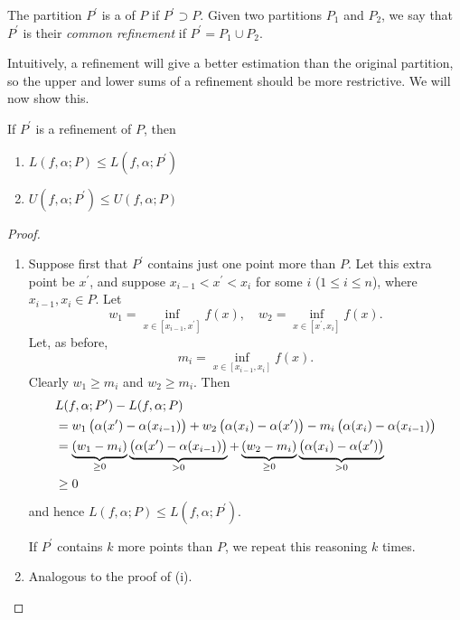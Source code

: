 The partition $P^\prime$ is a  of $P$ if $P^\prime\supset P$. Given two partitions $P_1$ and $P_2$, we say that $P^\prime$ is their \emph{common refinement} if $P^\prime=P_1\cup P_2$.

Intuitively, a refinement will give a better estimation than the original partition, so the upper and lower sums of a refinement should be more restrictive. We will now show this.

\begin{lemma}\label{lemma:int-refinement}
If $P^\prime$ is a refinement of $P$, then
\begin{enumerate}[label=(\roman*)]
\item $L(f,\alpha;P)\le L(f,\alpha;P^\prime)$
\item $U(f,\alpha;P^\prime)\le U(f,\alpha;P)$
\end{enumerate}
\end{lemma}

\begin{proof} \
\begin{enumerate}[label=(\roman*)]
\item Suppose first that $P^\prime$ contains just one point more than $P$. Let this extra point be $x^\prime$, and suppose $x_{i-1}<x^\prime<x_i$ for some $i$ ($1\le i\le n$), where $x_{i-1},x_i\in P$. Let
\[w_1=\inf_{x\in[x_{i-1},x^\prime]}f(x),\quad w_2=\inf_{x\in[x^\prime,x_i]}f(x).\]
Let, as before,
\[m_i=\inf_{x\in[x_{i-1},x_i]}f(x).\]
Clearly $w_1\ge m_i$ and $w_2\ge m_i$. Then
\begin{align*}
&L(f,\alpha;P^\prime)-L(f,\alpha;P)\\
&=w_1\left(\alpha(x^\prime)-\alpha(x_{i-1})\right)+w_2\left(\alpha(x_i)-\alpha(x^\prime)\right)-m_i\left(\alpha(x_i)-\alpha(x_{i-1})\right)\\
&=\underbrace{(w_1-m_i)}_{\ge0}\underbrace{\left(\alpha(x^\prime)-\alpha(x_{i-1})\right)}_{>0}+\underbrace{(w_2-m_i)}_{\ge0}\underbrace{\left(\alpha(x_i)-\alpha(x^\prime)\right)}_{>0}\\
&\ge0
\end{align*}
and hence $L(f,\alpha;P)\le L(f,\alpha;P^\prime)$.

If $P^\prime$ contains $k$ more points than $P$, we repeat this reasoning $k$ times.

\item Analogous to the proof of (i).
\end{enumerate}
\end{proof}

